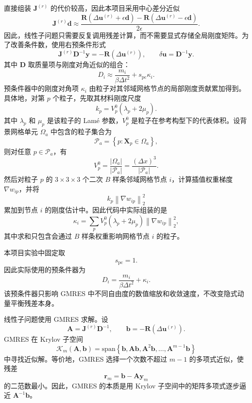 \documentclass[a4paper]{article}
\begin{document}
直接组装 $\bm{J}^{(r)}$ 的代价较高，因此本项目采用中心差分近似
\[
    \bm{J}^{(r)}\bm{d}
    \approx
    \frac{
        \bm{R}
        \left(
            \Delta\bm{u}^{(r)}
            +
            \epsilon\bm{d}
        \right)
        -
        \bm{R}
        \left(
            \Delta\bm{u}^{(r)}
            -
            \epsilon\bm{d}
        \right)
    }{
        2\epsilon
    }.
\]
因此，线性子问题只需要反复调用残差计算，而不需要显式存储全局刚度矩阵。为了改善条件数，使用右预条件形式
\[
    \bm{J}^{(r)}
    \bm{D}^{-1}
    \bm{y}
    =
    -
    \bm{R}
    \left(
        \Delta\bm{u}^{(r)}
    \right),
    \qquad
    \delta\bm{u}
    =
    \bm{D}^{-1}\bm{y}.
\]
其中 $\bm{D}$ 取质量项与刚度对角近似的组合：
\[
    D_i
    \approx
    \frac{m_i}{\beta\Delta t^2}
    +
    s_{\mathrm{pc}}\kappa_i.
\]
预条件器中的刚度对角项 $\kappa_i$ 由粒子对其邻域网格节点的局部刚度贡献累加得到。具体地，对第 $p$ 个粒子，先取其材料刚度尺度
\[
    k_p
    =
    V_p^0
    \left(
        \lambda_p+2\mu_p
    \right).
\]
其中 $\lambda_p$ 和 $\mu_p$ 是该粒子的 Lamé 参数，$V_p^0$ 是粒子在参考构型下的代表体积。设背景网格单元 $\Omega_a$ 中包含的粒子集合为
\[
    \mathcal{P}_a
    =
    \left\{
        p:\bm{X}_p\in\Omega_a
    \right\},
\]
则对任意 $p\in\mathcal{P}_a$，有
\[
    V_p^0
    =
    \frac{|\Omega_a|}{|\mathcal{P}_a|}
    =
    \frac{(\Delta x)^3}{|\mathcal{P}_a|}.
\]
然后对粒子 $p$ 的 $3\times 3\times 3$ 个二次 $B$ 样条邻域网格节点 $i$，计算插值权重梯度 $\nabla w_{ip}$，并将
\[
    k_p
    \left\|
        \nabla w_{ip}
    \right\|_2^2
\]
累加到节点 $i$ 的刚度估计中。因此代码中实际组装的是
\[
    \kappa_i
    =
    \sum_{p}
    V_p^0
    \left(
        \lambda_p+2\mu_p
    \right)
    \left\|
        \nabla w_{ip}
    \right\|_2^2,
\]
其中求和只包含会通过 $B$ 样条权重影响网格节点 $i$ 的粒子。

本项目实验中固定取
\[
    s_{\mathrm{pc}}=1.
\]
因此实际使用的预条件器为
\[
    D_i
    =
    \frac{m_i}{\beta\Delta t^2}
    +
    \kappa_i.
\]
该预条件器只影响 GMRES 中不同自由度的数值缩放和收敛速度，不改变隐式动量平衡残差本身。

线性子问题使用 GMRES 求解。设
\[
    \bm{A}
    =
    \bm{J}^{(r)}\bm{D}^{-1},
    \qquad
    \bm{b}
    =
    -
    \bm{R}
    \left(
        \Delta\bm{u}^{(r)}
    \right).
\]
GMRES 在 Krylov 子空间
\[
    \mathcal{K}_m(\bm{A},\bm{b})
    =
    \mathrm{span}
    \left\{
        \bm{b},
        \bm{A}\bm{b},
        \bm{A}^2\bm{b},
        \ldots,
        \bm{A}^{m-1}\bm{b}
    \right\}
\]
中寻找近似解。等价地，GMRES 选择一个次数不超过 $m-1$ 的多项式近似，使残差
\[
    \bm{r}_m
    =
    \bm{b}
    -
    \bm{A}\bm{y}_m
\]
的二范数最小。因此，GMRES 的本质是用 Krylov 子空间中的矩阵多项式逐步逼近 $\bm{A}^{-1}\bm{b}$。
\end{document}
